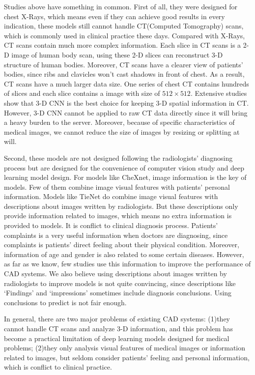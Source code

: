 \documentclass[runningheads]{llncs}
\begin{document}
Studies above have something in common. First of all, they were designed for chest X-Rays, which means even if they can achieve good results in every indication, these models still cannot handle CT(Computed Tomography) scans, which is commonly used in clinical practice these days. Compared with  X-Rays, CT scans contain much more complex information.  Each slice in CT scans is a 2-D image of human body scan, using these 2-D slices can reconstruct 3-D structure of human bodies. Moreover, CT scans have a clearer view of patients' bodies, since ribs and clavicles won't cast shadows in front of chest. As a result, CT scans have a much larger data size. One series of chest CT contains hundreds of slices and each slice contains a image with size of $512 \times 512$. Extensive studies show that 3-D CNN is the best choice for keeping 3-D spatial information in CT\cite{Yorozu1987Electron}. However, 3-D CNN cannot be applied to raw CT data directly since it will bring a heavy burden to the server. Moreover, because of specific characteristics of medical images, we cannot reduce the size of images by resizing or splitting at will.

Second, these models are not designed following the radiologists' diagnosing process but are designed for the convenience of computer vision study and deep learning model design. For models like CheXnet, image information is the key of models. Few of them combine image visual features with patients' personal information. Models like TieNet do combine image visual features with descriptions about images written by radiologists. But these descriptions only provide information related to images, which means no extra information is provided to models. It is conflict to clinical diagnosis process.
Patients' complaints is a very useful information when doctors are diagnosing, since complaints is patients' direct feeling about their physical condition. Moreover, information of age and gender is also related to some certain diseases. However, as far as we know, few studies use this information to improve the performance of CAD systems. We also believe using descriptions about images written by radiologists to improve models is not quite convincing, since descriptions like `Findings' and `impressions' sometimes include diagnosis conclusions. Using conclusions to predict is not fair enough.

In general, there are two major problems of existing CAD systems: (1)they cannot handle CT scans and analyze 3-D information, and this problem has become a practical limitation of deep learning models designed for medical problems; (2)they only analysis visual features of medical images or information related to images, but seldom consider patients' feeling and personal information, which is conflict to clinical practice.
\end{document}
